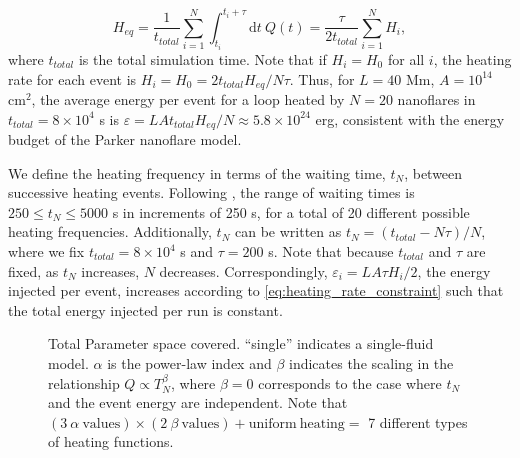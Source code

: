 \documentclass[preprint,linenumbers]{aastex}
\begin{document}
	\begin{equation}
		\label{eq:heating_rate_constraint}
		H_{eq} = \frac{1}{t_{total}}\sum_{i=1}^N\int_{t_i}^{t_i+\tau}\mathrm{d}t~Q(t) = \frac{\tau}{2t_{total}}\sum_{i=1}^NH_i,
	\end{equation}
	where $t_{total}$ is the total simulation time. Note that if $H_i=H_0$ for all $i$, the heating rate for each event is $H_i=H_0=2t_{total}H_{eq}/N\tau$. Thus, for $L=40$ Mm, $A=10^{14}$ cm$^2$, the average energy per event for a loop heated by $N=20$ nanoflares in $t_{total}=8\times10^4$ s is $\varepsilon=LAt_{total}H_{eq}/N\approx5.8\times10^{24}$ erg, consistent with the energy budget of the Parker nanoflare model. 
	\par We define the heating frequency in terms of the waiting time, $t_N$, between successive heating events. Following \citet{cargill_active_2014}, the range of waiting times is $250\le t_N\le5000$ s in increments of 250 s, for a total of 20 different possible heating frequencies. Additionally, $t_N$ can be written as $t_N=(t_{total}-N\tau)/N$, where we fix $t_{total}=8\times10^4$ s and $\tau=200$ s. Note that because $t_{total}$ and $\tau$ are fixed, as $t_N$ increases, $N$ decreases. Correspondingly, $\varepsilon_i=LA\tau H_i/2$, the energy injected per event, increases according to \autoref{eq:heating_rate_constraint} such that the total energy injected per run is constant.
	\begin{figure}
		\centering
		
		\caption{Total Parameter space covered. ``single'' indicates a single-fluid model. $\alpha$ is the power-law index and $\beta$ indicates the scaling in the relationship $Q\propto T_N^{\beta}$, where $\beta=0$ corresponds to the case where $t_N$ and the event energy are independent. Note that $(3~\alpha~\mathrm{values})\times(2~\beta~\mathrm{values})+\mathrm{uniform~heating}=$ 7 different types of heating functions.}
		\label{fig:parameter_space}
	\end{figure}
\end{document}
